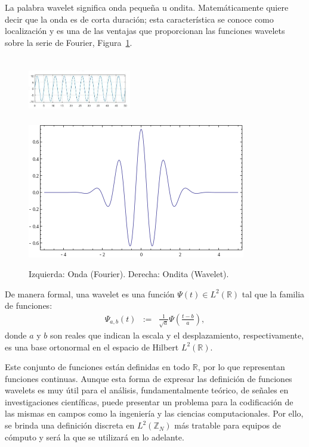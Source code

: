 \par La palabra wavelet significa onda peque\~na u ondita. Matem\'aticamente quiere decir que la onda es de corta duraci\'on; esta caracter\'istica se conoce como localizaci\'on y es una de las ventajas que proporcionan las funciones wavelets sobre la serie de Fourier, Figura~\ref{wav-fourier}.\\

\begin{figure}[h]
\center
\includegraphics[height=29mm, width=45mm]{Graphics/FourierOnda.png}
\includegraphics[scale=.33]{Graphics/FuncionWavelet.png}
\caption{Izquierda: Onda (Fourier). Derecha: Ondita (Wavelet).}
\label{wav-fourier}
\end{figure}

\begin{definition}
De manera formal, una wavelet es una funci\'on $\Psi(t)\in L^2(\mathbb{R})$ tal que la familia de funciones:
\begin{eqnarray}
\Psi_{a,b}(t)&:=&\frac{1}{\sqrt{a}}\Psi\left(\frac{t-b}{a}\right),\nonumber
\end{eqnarray}
donde $a$ y $b$ son reales que indican la escala y el desplazamiento, respectivamente, es una base ortonormal en el espacio de Hilbert $L^2(\mathbb{R})$.
\label{wav-continua}
\end{definition}

\par Este conjunto de funciones est\'an definidas en todo $\mathbb{R}$, por lo que representan funciones continuas. Aunque esta forma de expresar las definici\'on de funciones wavelets es muy \'util para el an\'alisis, fundamentalmente te\'orico, de se\~nales en investigaciones cient\'ificas, puede presentar un problema para la codificaci\'on de las mismas en campos como la ingenier\'ia y las ciencias computacionales. Por ello, se brinda una definici\'on discreta en $L^2\left(\mathbb{Z}_N\right)$ m\'as tratable para equipos de c\'omputo y ser\'a la que se utilizar\'a en lo adelante.\\

